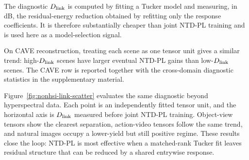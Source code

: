 The diagnostic \(D_{\mathrm{link}}\) is computed by fitting a Tucker model and measuring,
in dB, the residual-energy reduction obtained by refitting only the response coefficients. It
is therefore substantially cheaper than joint NTD-PL training and is used here
as a model-selection signal.

On CAVE reconstruction, treating each scene as one tensor unit gives a similar
trend: high-\(D_{\mathrm{link}}\) scenes have larger eventual
NTD-PL gains than low-\(D_{\mathrm{link}}\) scenes. The CAVE row is reported together
with the cross-domain diagnostic statistics in the supplementary material.

Figure~\ref{fig:nonhsi-link-scatter} evaluates the same diagnostic beyond
hyperspectral data. Each point is an independently fitted tensor unit, and the
horizontal axis is \(D_{\mathrm{link}}\) measured before joint NTD-PL training. Object-view
tensors show the clearest separation, action-video tensors follow the same
trend, and natural images occupy a lower-yield but still positive regime. These
results close the loop: NTD-PL is most effective when a matched-rank Tucker fit
leaves residual structure that can be reduced by a shared entrywise response.
